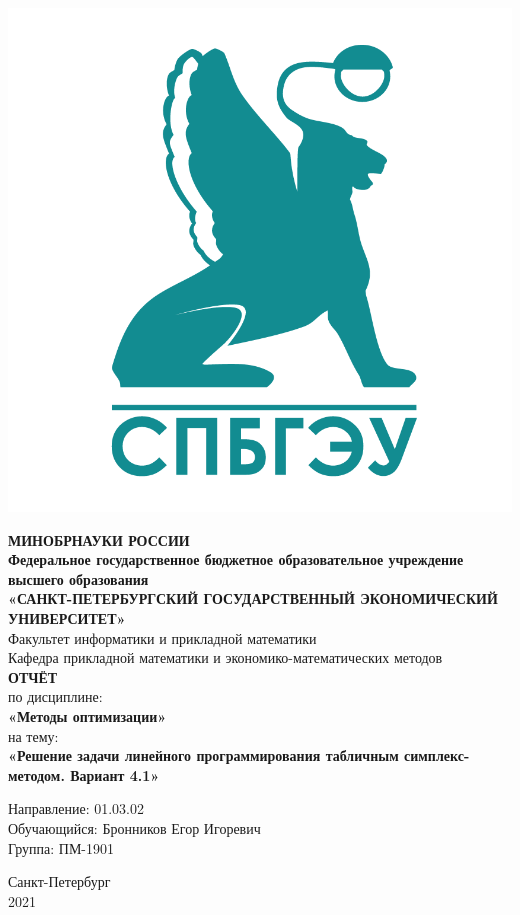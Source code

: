 \documentclass[14pt,a4paper,fleqn]{extarticle}
\begin{document}
	\begin{titlepage}
		\includegraphics[scale=0.12]{logo}
		\begin{center}
			\textbf{МИНОБРНАУКИ РОССИИ}\\
			\vspace{0.2cm}
			\textbf{Федеральное государственное бюджетное образовательное учреждение высшего образования}\\
			\textbf{«САНКТ-ПЕТЕРБУРГСКИЙ ГОСУДАРСТВЕННЫЙ ЭКОНОМИЧЕСКИЙ УНИВЕРСИТЕТ»}\\
			\vspace{0.6cm}
			Факультет информатики и прикладной математики\\
			Кафедра прикладной математики и экономико-математических методов\\
			\vspace{1cm}
			\textbf{ОТЧЁТ}\\
			по дисциплине:\\
			\textbf{«Методы оптимизации»}\\
			на тему:\\
			\textbf{«Решение задачи линейного программирования табличным симплекс-методом. Вариант 4.1»}\\
		\end{center}
		\vspace{1cm}
		Направление: 01.03.02\\
		Обучающийся: Бронников Егор Игоревич\\
		Группа: ПМ-1901\\
		\vfill
		\begin{center}
			Санкт-Петербург\\
			2021\\
		\end{center}
	\end{titlepage}
\end{document}
